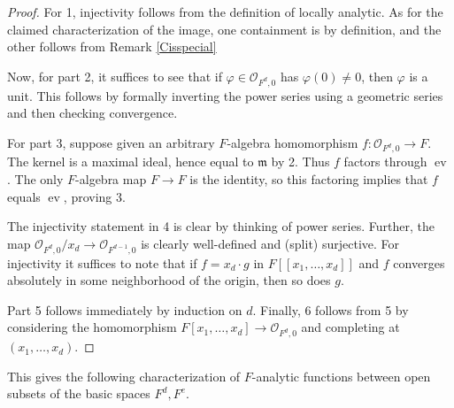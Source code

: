 \documentclass[12pt]{article}
\begin{document}
\begin{proof}

For 1, injectivity follows from the definition of locally analytic. As for the claimed characterization of the image, one containment is by definition, and the other follows from Remark \ref{Cisspecial}  

Now, for part 2, it suffices to see that if $\varphi\in\mathcal{O}_{F^d,0}$ has $\varphi(0)\neq 0$, then $\varphi$ is a unit.  This follows by formally inverting the power series using a geometric series and then checking convergence.

For part 3, suppose given an arbitrary $F$-algebra homomorphism $f:\mathcal{O}_{F^d,0}\rightarrow F$.  The kernel is a maximal ideal, hence equal to $\mathfrak{m}$ by 2.  Thus $f$ factors through $\operatorname{ev}$.  The only $F$-algebra map $F\rightarrow F$ is the identity, so this factoring implies that $f$ equals $\operatorname{ev}$, proving 3.

The injectivity statement in 4 is clear by thinking of power series. Further, the map $\mathcal{O}_{F^d,0}/x_d\rightarrow \mathcal{O}_{F^{d-1},0}$ is clearly well-defined and (split) surjective.  For injectivity it suffices to note that if $f=x_d\cdot g$ in $F[[x_1,\ldots,x_d]]$ and $f$ converges absolutely in some neighborhood of the origin, then so does $g$.

Part 5 follows immediately by induction on $d$.  Finally, 6 follows from 5 by considering the homomorphism $F[x_1,\ldots,x_d]\rightarrow \mathcal{O}_{F^d,0}$ and completing at $(x_1,\ldots,x_d)$.\end{proof}

This gives the following characterization of $F$-analytic functions between open subsets of the basic spaces $F^d,F^e$.
\end{document}
